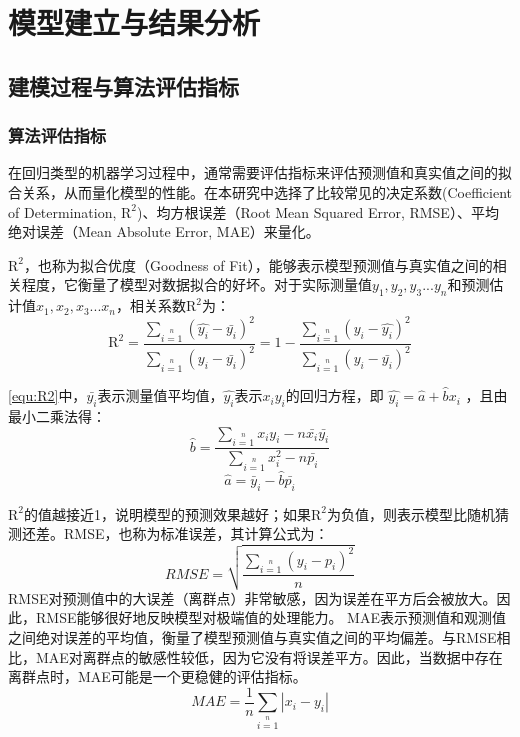 \section{模型建立与结果分析}
\subsection{建模过程与算法评估指标}
\subsubsection{算法评估指标}
在回归类型的机器学习过程中，通常需要评估指标来评估预测值和真实值之间的拟合关系，从而量化模型的性能。在本研究中选择了比较常见的决定系数(Coefficient of Determination, $\mathrm{R^2}$)、均方根误差（Root Mean Squared Error, RMSE）、平均绝对误差（Mean Absolute Error, MAE）来量化。

$\mathrm{R^2}$，也称为拟合优度（Goodness of Fit），能够表示模型预测值与真实值之间的相关程度，它衡量了模型对数据拟合的好坏。对于实际测量值{$y_1,y_2,y_3...y_n$}和预测估计值{$x_1,x_2,x_3...x_n$}，相关系数$\mathrm{R^2}$为：
\begin{equation}
    \label{equ:R2}
\mathrm{R^2}=\frac{\sum\limits_{i=1}\limits^{n}\left(\widehat{y_i}-\bar{y_i}\right)^2}{\sum\limits_{i=1}\limits^{n}\left(y_i-\bar{y_i}\right)^2}=1-\frac{\sum\limits_{i=1}\limits^{n}\left(y_i-\widehat{y_i}\right)^2}{\sum\limits_{i=1}\limits^{n}\left(y_i-\bar{y_i}\right)^2}
\end{equation}

\autoref{equ:R2}中，$\bar{y_i}$表示测量值平均值，$\widehat{y_i}$表示$x_i y_i$的回归方程，即 $\widehat{y_i}=\widehat{a}+\widehat{b} x_i$ ，且由最小二乘法得：
\begin{equation}
    \label{equ:R2-b}
\widehat{b}=\frac{\sum \limits_{i=1}\limits^{n} x_iy_i-n\bar{x_i}\bar{y_i}}{\sum \limits_{i=1}\limits^{n}x_i^2-n\bar{p_i}}
\end{equation}
\begin{equation}
    \label{equ:R2-a}
    \widehat{a}=\bar{y}_i-\widehat{b}\bar{p_i}
\end{equation}

$\mathrm{R^2}$的值越接近1，说明模型的预测效果越好；如果$\mathrm{R^2}$为负值，则表示模型比随机猜测还差。RMSE，也称为标准误差，其计算公式为：
\begin{equation}
    \label{equ:RMSE}
    RMSE=\sqrt{\frac{\sum\limits_{i=1}\limits^{n}\left(y_i-p_i\right)^2}{n}}
\end{equation}
RMSE对预测值中的大误差（离群点）非常敏感，因为误差在平方后会被放大。因此，RMSE能够很好地反映模型对极端值的处理能力。
MAE表示预测值和观测值之间绝对误差的平均值，衡量了模型预测值与真实值之间的平均偏差。与RMSE相比，MAE对离群点的敏感性较低，因为它没有将误差平方。因此，当数据中存在离群点时，MAE可能是一个更稳健的评估指标。
\begin{equation}
    \label{equ:MAE}
    MAE = \frac{1}{n}\sum\limits_{i=1}\limits^{n}|x_i-y_i|
\end{equation}

